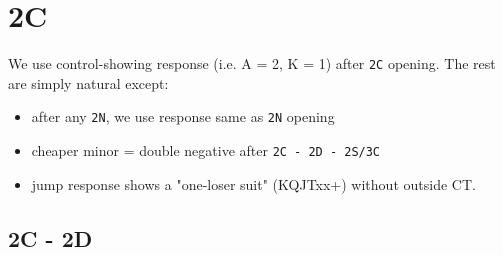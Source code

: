 \section{2C}

We use control-showing response (i.e. A = 2, K = 1) after \texttt{2C} opening. The rest are simply natural except:
\begin{itemize}
    \setlength\itemsep{0pt}
    \item after any \texttt{2N}, we use response same as \texttt{2N} opening
    \item cheaper minor = double negative after \texttt{2C - 2D - 2S/3C}
    \item jump response shows a "one-loser suit" (KQJTxx+) without outside CT.
\end{itemize}


\subsection{2C - 2D}



